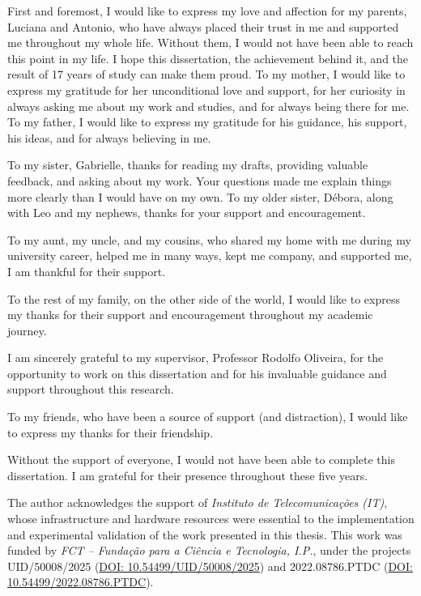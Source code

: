 
%

\begin{ntacknowledgements}

First and foremost, I would like to express my love and affection for my parents, Luciana and Antonio, who have always placed their trust in me and supported me throughout my whole life. Without them, I would not have been able to reach this point in my life. I hope this dissertation, the achievement behind it, and the result of 17 years of study can make them proud. To my mother, I would like to express my gratitude for her unconditional love and support, for her curiosity in always asking me about my work and studies, and for always being there for me. To my father, I would like to express my gratitude for his guidance, his support, his ideas, and for always believing in me.

To my sister, Gabrielle, thanks for reading my drafts, providing valuable feedback, and asking about my work. Your questions made me explain things more clearly than I would have on my own. To my older sister, Débora, along with Leo and my nephews, thanks for your support and encouragement. 

To my aunt, my uncle, and my cousins, who shared my home with me during my university career, helped me in many ways, kept me company, and supported me, I am thankful for their support.

To the rest of my family, on the other side of the world, I would like to express my thanks for their support and encouragement throughout my academic journey.  

I am sincerely grateful to my supervisor, Professor Rodolfo Oliveira, for the opportunity to work on this dissertation and for his invaluable guidance and support throughout this research.

To my friends, who have been a source of support (and distraction), I would like to express my thanks for their friendship.

Without the support of everyone, I would not have been able to complete this dissertation. I am grateful for their presence throughout these five years.

The author acknowledges the support of \emph{Instituto de Telecomunicações (IT)}, whose infrastructure and hardware resources were essential to the implementation and experimental validation of the work presented in this thesis. This work was funded by \emph{FCT – Fundação para a Ciência e Tecnologia, I.P.}, under the projects UID/50008/2025 (\href{https://doi.org/10.54499/UID/50008/2025}{DOI: 10.54499/UID/50008/2025}) and 2022.08786.PTDC (\href{https://doi.org/10.54499/2022.08786.PTDC}{DOI: 10.54499/2022.08786.PTDC}).
\end{ntacknowledgements}
